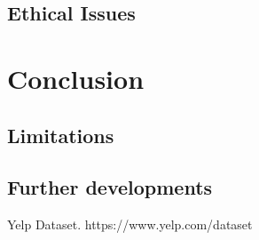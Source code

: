 \documentclass[conference]{IEEEtran}
\begin{document}
\subsection{Ethical Issues}

\section{Conclusion}

\subsection{Limitations}

\subsection{Further developments}


\begin{thebibliography}{00}
     Yelp Dataset. https://www.yelp.com/dataset
\end{thebibliography}
\end{document}
